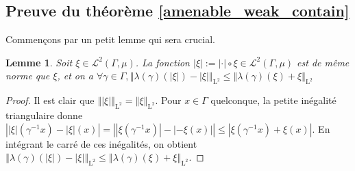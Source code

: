 \documentclass[a4paper,12pt]{article}
\newtheorem{lemma}[theorem]{Lemme}
\newcommand{\norm}[1]{\left\Vert #1\right\Vert}
\newcommand{\abs}[1]{\left\vert#1\right\vert}
\newcommand{\inv}{^{-1}}
\newcommand{\comp}{\circ}
\begin{document}
\subsection{Preuve du théorème \ref{amenable_weak_contain}}

Commençons par un petit lemme qui sera crucial.

\begin{lemma}\label{abs_trick}
    Soit $\xi\in\mathscr{L}^2(\Gamma, \mu)$. La fonction $\abs{\xi} := \abs{\cdot}\comp\xi \in\mathscr{L}^2(\Gamma, \mu)$ est de même norme 
    que $\xi$, et on a $\forall\gamma\in\Gamma, \norm{\lambda(\gamma)(\abs{\xi}) - \abs{\xi}}_{\mathrm{L}^2} \le \norm{\lambda(\gamma)(\xi) + \xi}_{\mathrm{L}^2}$
\end{lemma}

\begin{proof}
    Il est clair que $\norm{\abs{\xi}}_{\mathrm{L}^2} = \norm{\xi}_{\mathrm{L}^2}$. Pour $x\in\Gamma$ quelconque, 
    la petite inégalité triangulaire donne $\abs{\abs{\xi}(\gamma\inv x) - \abs{\xi}(x)} = \abs{\abs{\xi(\gamma\inv x)} - \abs{- \xi(x)}} \leq \abs{\xi(\gamma\inv x) + \xi(x)}$. En intégrant le carré de ces inégalités,
    on obtient $\norm{\lambda(\gamma)(\abs{\xi}) - \abs{\xi}}_{\mathrm{L}^2} \leq \norm{\lambda(\gamma)(\xi) + \xi}_{\mathrm{L}^2}$.
\end{proof}
\end{document}
